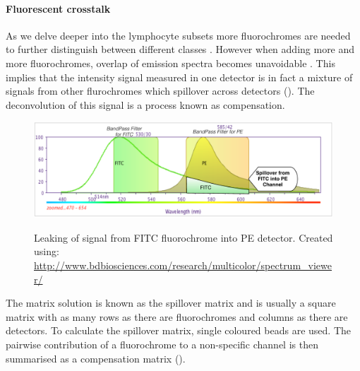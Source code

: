 \paragraph{Fluorescent crosstalk}
As we delve deeper into the lymphocyte subsets more fluorochromes are needed to further distinguish between different classes \citep{Perfetto:2004cy}.
However when adding more and more fluorochromes, overlap of emission spectra becomes unavoidable \citep{Roederer:2001vi}.
This implies that the intensity signal measured in one detector is in fact a mixture of signals from other flurochromes which spillover across detectors ().
The deconvolution of this signal is a process known as compensation.
\begin{figure}[h]
\begin{center}
   \includegraphics[scale=0.6]{figures/spillover.pdf}
\end{center}
{ Leaking of signal from FITC fluorochrome into PE detector.}
{
  \small{Created using: \url{http://www.bdbiosciences.com/research/multicolor/spectrum_viewer/}}
}
\end{figure}
The matrix solution is known as the spillover matrix and is usually a square matrix with as many rows as there are fluorochromes and columns as there are detectors.
To calculate the spillover matrix, single coloured beads are used. 
The pairwise contribution of a fluorochrome to a non-specific channel is then summarised as a compensation matrix ().
